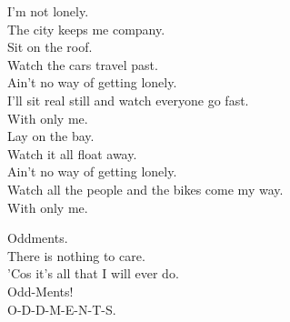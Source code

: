 

I'm not lonely. \\
The city keeps me company. \\

Sit on the roof. \\
Watch the cars travel past. \\
Ain't no way of getting lonely. \\
I'll sit real still and watch everyone go fast. \\
With only me. \\

Lay on the bay. \\
Watch it all float away. \\
Ain't no way of getting lonely. \\
Watch all the people and the bikes come my way. \\
With only me. \\




Oddments. \\
There is nothing to care. \\
'Cos it's all that I will ever do. \\
Odd-Ments! \\

O-D-D-M-E-N-T-S. \\
